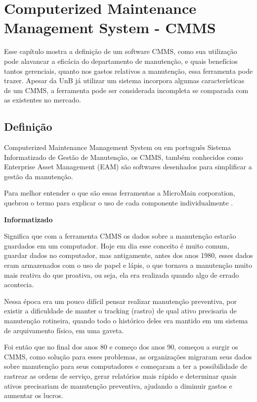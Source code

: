 \chapter{Computerized Maintenance Management System - CMMS}
\label{cmms}

Esse capítulo mostra a definição de um software CMMS, como sua utilização pode alavancar a eficácia do departamento de manutenção, e quais benefícios tantos gerenciais, quanto nos gastos relativos a manutenção, essa ferramenta pode trazer. Apesar da UnB já utilizar um sistema incorpora algumas características de um CMMS, a ferramenta pode ser considerada incompleta se comparada com as existentes no mercado.



\section{Definição}

Computerized Maintenance Management System ou em português Sistema Informatizado de Gestão de Manutenção, os CMMS, também conhecidos como Enterprise Asset Management (EAM) são softwares desenhados para simplificar a gestão da manutenção.

Para melhor entender o que são essas ferramentas a MicroMain corporation, quebrou o termo para explicar o uso de cada componente individualmente \cite{micromain}.

\textbf{Informatizado}

Significa que com a ferramenta CMMS os dados sobre a manutenção estarão guardados em um computador. Hoje em dia esse conceito é muito comum, guardar dados no computador, mas antigamente, antes dos anos 1980, esses dados eram armazenados com o uso de papel e lápis, o que tornava a manutenção muito mais reativa do que proativa, ou seja, ela era realizada quando algo de errado acontecia. 

Nessa época era um pouco difícil pensar realizar manutenção preventiva, por existir a dificuldade de manter o tracking (rastro) de qual ativo precisaria de manutenção rotineira, quando todo o histórico deles era mantido em um sistema de arquivamento físico, em uma gaveta. 

Foi então que no final dos anos 80 e começo dos anos 90, começou a surgir os CMMS, como solução para esses problemas, as organizações migraram seus dados sobre manutenção para seus computadores e começaram a ter a possibilidade de rastrear as ordens de serviço, gerar relatórios mais rápido e determinar quais ativos precisariam de manutenção preventiva, ajudando a diminuir gastos e aumentar os lucros. 

